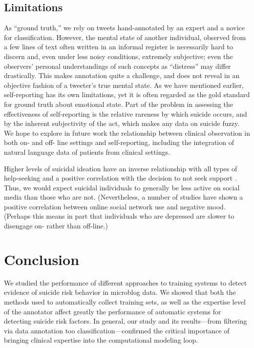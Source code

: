 \documentclass[11pt]{article}
\begin{document}
\subsection{Limitations}
As ``ground truth,'' we rely on tweets hand-annotated by an expert and a novice for classification. However, the mental state of another individual, observed from a few lines of text  often written in an informal register is necessarily hard to discern and, even under less noisy conditions, extremely subjective; even the observers' personal understandings of such concepts as ``distress'' may differ drastically. This makes annotation quite a challenge, and does not reveal in an objective fashion of a tweeter's true mental state. As we have mentioned earlier, self-reporting has its own limitations, yet it is often regarded as the gold standard for ground truth about emotional state.
Part of the problem in assessing the effectiveness of self-reporting is the relative rareness by which suicide occurs, and by the inherent subjectivity of the act, which makes any data on suicide fuzzy. We hope to explore in future work the relationship between clinical observation in both on- and off- line settings and self-reporting, including the integration of natural language data of patients from clinical settings.


Higher levels of suicidal ideation have an inverse relationship with all types of help-seeking and a positive correlation with the decision to not seek support \cite{deane2001suicidal}. Thus, we would expect suicidal individuals to generally be less active on social media than those who are not. (Nevertheless, a number of studies have shown a positive correlation between online social network use and negative mood. (Perhaps this means in part that individuals who are depressed are slower to disengage on- rather than off-line.)
 

\section{Conclusion}



We studied the performance of different approaches to training systems to detect evidence of suicide risk behavior in microblog data. We showed that both the methods used to automatically collect training sets, as well as the expertise level of the annotator affect greatly the performance of automatic systems for detecting suicide risk factors. In general, our study and its results---from filtering via data annotation too classification---confirmed the critical importance of bringing clinical expertise into the computational modeling loop. 
\end{document}
